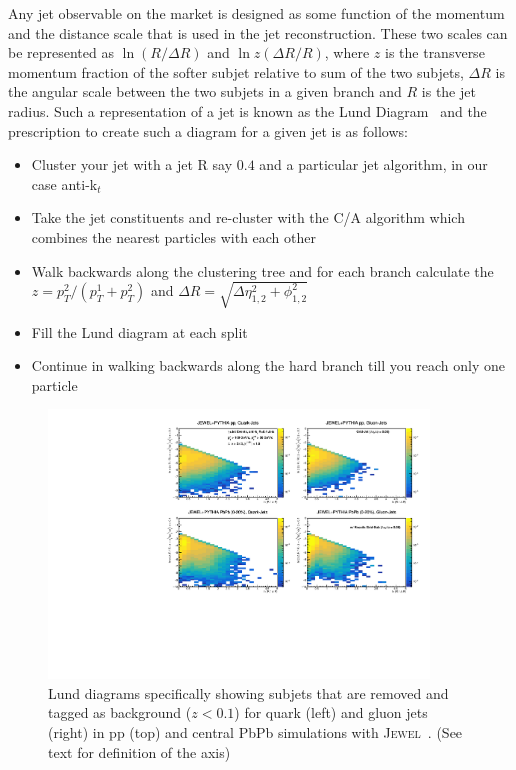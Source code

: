 \documentclass[notoc]{JHEP3}
\newcommand{\jw}{\textsc{Jewel}~}
\begin{document}
Any jet observable on the market is designed as some function of the momentum and the distance scale that is used in the jet reconstruction. These two scales can be represented as $\ln (R/\Delta R)$ and $\ln z(\Delta R/R)$, where $z$ is the transverse momentum fraction of the softer subjet relative to sum of the two subjets, $\Delta R$ is the angular scale between the two subjets in a given branch and $R$ is the jet radius. Such a representation of a jet is known as the Lund Diagram~\cite{Salam:2016yht} and the prescription to create such a diagram for a given jet is as follows: 
\begin{itemize}
	\item Cluster your jet with a jet R say $0.4$ and a particular jet algorithm, in our case anti-k$_{t}$ 
	\item Take the jet constituents and re-cluster with the C/A algorithm which combines the nearest particles with each other
	\item Walk backwards along the clustering tree and for each branch calculate the $z=p^{2}_{T}/(p^{1}_{T}+p^{2}_{T})$ and $\Delta R = \sqrt{\Delta \eta^2_{1, 2}+\phi^2_{1, 2}}$ 
	\item Fill the Lund diagram at each split 
	\item Continue in walking backwards along the hard branch till you reach only one particle 
\end{itemize}

\begin{figure}[h]
	\centering
	\includegraphics[width=0.9\textwidth]{plots/Individual_LundDiagrams_zrel_background.pdf}
	\caption{Lund diagrams specifically showing subjets that are removed and tagged as background ($z<0.1$) for quark (left) and gluon jets (right) in pp (top) and central PbPb simulations with \jw. (See text for definition of the axis)}
\label{fig:Lund_bkg}
\end{figure}
\end{document}
